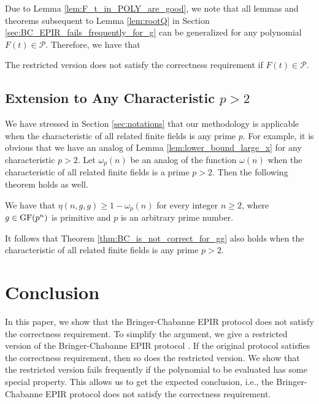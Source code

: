 \documentclass[JMC]{degruyter-journal}
\begin{document}
Due to Lemma \ref{lem:F_t_in_POLY_are_good}, we note that all lemmas
and theorems subsequent to Lemma \ref{lem:rootQ} in Section
\ref{sec:BC_EPIR_fails_frequently_for_g} can be generalized  for any
polynomial $F(t)\in \mathcal{P}$. Therefore, we have that

\begin{theorem}\label{thm:BC_is_not_correct_for_gg}
The restricted version  does not satisfy the correctness requirement if $F(t)\in
\mathcal{P}$.
\end{theorem}


\subsection{Extension to Any Characteristic $p>2$}
We have stressed in Section \ref{sec:notations} that our methodology
is applicable when the characteristic of all related finite fields
is any prime $p$. For example, it is obvious that
we have an analog of Lemma \ref{lem:lower_bound_large_x} for any
characteristic $p>2$.
Let $\omega_p(n)$ be an analog of the
function $\omega(n)$ when the characteristic of all related finite
fields is a prime $p>2$.
Then the following theorem holds as
well.
\begin{theorem}\label{thm:lower_bound_eta_for_any_n_p}

We have that $\eta(n,g,g)\geq 1-\omega_p(n)$ for every integer
$n\geq 2$, where $g\in {\rm GF}(p^n)$ is primitive and $p$ is an
arbitrary prime number.
\end{theorem}
It follows that Theorem \ref{thm:BC_is_not_correct_for_gg} also
holds when the  characteristic of all related finite fields is any
prime  $p>2$.

\section{Conclusion}

In this paper, we  show that the Bringer-Chabanne EPIR protocol does not satisfy the correctness requirement.
 To simplify the argument, we give a restricted version of  the Bringer-Chabanne EPIR protocol   . If the original protocol satisfies the correctness requirement, then so does the restricted version.
We  show that the restricted version fails frequently   if the
polynomial to be evaluated has some special property. This allows us
to get the expected conclusion, i.e., the Bringer-Chabanne EPIR
protocol    does not satisfy the correctness requirement.
\end{document}
